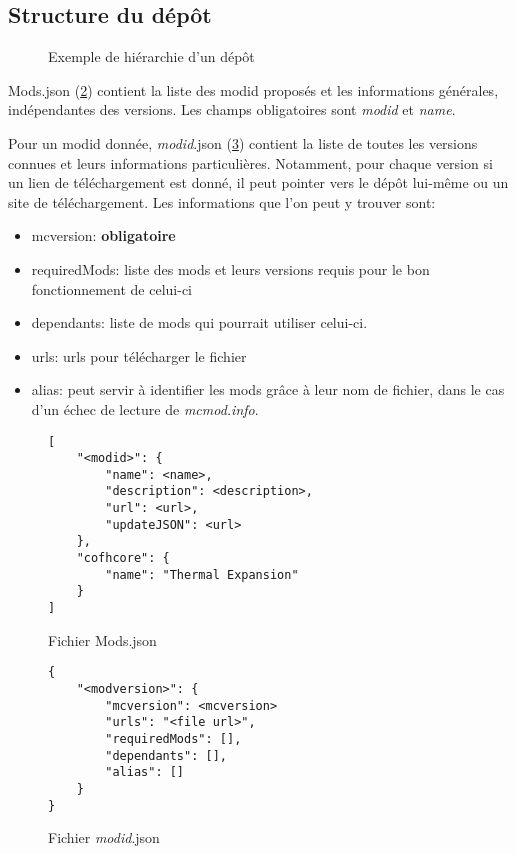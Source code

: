 \documentclass{article}
\begin{document}
\subsection{Structure du dépôt}
\begin{figure}
\caption{Exemple de hiérarchie d'un dépôt}
\label{fig:hierarchie}
\end{figure}

Mods.json (\ref{figure:mods.json}) contient la liste des modid proposés et les informations générales, indépendantes des versions.
Les champs obligatoires sont \textit{modid} et \textit{name}.

Pour un modid donnée, \textit{modid}.json (\ref{figure:modid.json}) contient la liste de toutes les versions connues et leurs informations particulières.
Notamment, pour chaque version si un lien de téléchargement est donné, il peut pointer vers le dépôt lui-même ou un site de téléchargement.
Les informations que l'on peut y trouver sont:
\begin{itemize}
    \item mcversion: \textbf{obligatoire}
    \item requiredMods: liste des mods et leurs versions requis pour le bon fonctionnement de celui-ci
    \item dependants: liste de mods qui pourrait utiliser celui-ci.
    \item urls: urls pour télécharger le fichier
    \item alias: peut servir à identifier les mods grâce à leur nom de fichier, dans le cas d'un échec de lecture de \textit{mcmod.info}.
\end{itemize}

\begin{figure}
\centering
\begin{verbatim}
[
    "<modid>": {
        "name": <name>,
        "description": <description>,
        "url": <url>,
        "updateJSON": <url>
    },
    "cofhcore": {
        "name": "Thermal Expansion"
    }
]
\end{verbatim}
\caption{Fichier Mods.json}
\label{figure:mods.json}
\end{figure}

\begin{figure}
\begin{verbatim}
{
    "<modversion>": {
        "mcversion": <mcversion>
        "urls": "<file url>",
        "requiredMods": [],
        "dependants": [],
        "alias": []
    }
}
\end{verbatim}
\caption{Fichier \textit{modid}.json}
\label{figure:modid.json}
\end{figure}
\end{document}
